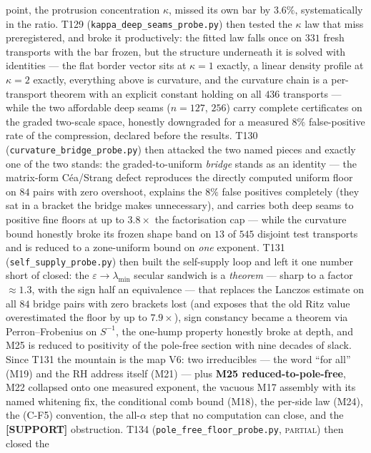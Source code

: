 \documentclass[11pt,a4paper]{article}
\begin{document}
point, the protrusion concentration $\kappa$, missed its own bar by $3.6\%$, systematically in
the ratio. T129 (\texttt{kappa\_deep\_seams\_probe.py}) then tested the $\kappa$ law that miss
preregistered, and broke it productively: the fitted law falls once on $331$ fresh transports
with the bar frozen, but the structure underneath it is solved with identities --- the flat
border vector sits at $\kappa=1$ exactly, a linear density profile at $\kappa=2$ exactly,
everything above is curvature, and the curvature chain is a per-transport theorem with an
explicit constant holding on all $436$ transports --- while the two affordable deep seams
($n=127$, $256$) carry complete certificates on the graded two-scale space, honestly
downgraded for a measured $8\%$ false-positive rate of the compression, declared before the
results. T130 (\texttt{curvature\_bridge\_probe.py}) then attacked the two named pieces and
exactly one of the two stands: the graded-to-uniform \emph{bridge} stands as an identity ---
the matrix-form C\'ea/Strang defect reproduces the directly computed uniform floor on $84$
pairs with zero overshoot, explains the $8\%$ false positives completely (they sat in a
bracket the bridge makes unnecessary), and carries both deep seams to positive fine floors
at up to $3.8\times$ the factorisation cap --- while the curvature bound honestly broke its
frozen shape band on $13$ of $545$ disjoint test transports and is reduced to a zone-uniform
bound on \emph{one} exponent. T131 (\texttt{self\_supply\_probe.py}) then built the
self-supply loop and left it one number short of closed: the $\varepsilon\to\lambda_{\min}$
secular sandwich is a \emph{theorem} --- sharp to a factor $\approx1.3$, with the sign half
an equivalence --- that replaces the Lanczos estimate on all $84$ bridge pairs with zero
brackets lost (and exposes that the old Ritz value overestimated the floor by up to
$7.9\times$), sign constancy became a theorem via Perron--Frobenius on $S^{-1}$, the
one-hump property honestly broke at depth, and M25 is reduced to positivity of the
pole-free section with nine decades of slack. Since T131 the mountain is the map V6: two
irreducibles --- the word ``for all'' (M19) and the RH address itself (M21) --- plus
\textbf{M25 reduced-to-pole-free}, M22 collapsed
onto one measured exponent, the vacuous M17 assembly with its named whitening fix, the
conditional comb bound (M18), the per-side law (M24), the (C-F5) convention, the
all-$\alpha$ step that no computation can close, and the \textbf{[SUPPORT]} obstruction.
T134 (\texttt{pole\_free\_floor\_probe.py}, \textsc{partial}) then closed the
\end{document}
